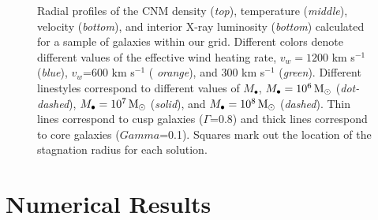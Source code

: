 \documentclass[usenatbib,fleqn]{mn2e}
\newcommand{\Mbh}[1][]{M_{\bullet#1}}
\newcommand{\vwO}{v_{w}}
\begin{document}
\begin{figure}
  \caption{\label{fig:profiles}Radial profiles of the CNM density
    ({\it top}), temperature ({\it middle}), velocity ({\it bottom}),
    and interior X-ray luminosity ({\it bottom}) calculated for a
    sample of galaxies within our grid.  Different colors
    denote different values of the effective wind heating rate,
    $\vwO=1200$ km s$^{-1}$ ({\it blue}), $\vwO$=600 km s$^{-1}$ ({\it
      orange}), and 300 km s$^{-1}$ ({\it green}).  Different
    linestyles correspond to different values of $\Mbh$, $\Mbh=10^6
    \Msun$ ({\it dot-dashed}), $\Mbh=10^7 \Msun$ ({\it solid}), and
    $\Mbh=10^8 \Msun$ ({\it dashed}). Thin lines correspond to cusp
    galaxies ($\Gamma$=0.8) and thick lines correspond to core
    galaxies ($Gamma$=0.1). Squares mark out the location of
    the stagnation radius for each solution.
 }
\end{figure}


%


\section{Numerical Results}
\label{sec:numerical}
\end{document}
